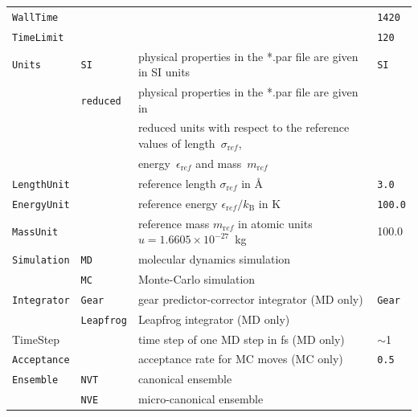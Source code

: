 \begin{landscape}
\begin{longtable}{llll}
		\texttt{WallTime}    & &  &     \texttt{1420}\\
		\texttt{TimeLimit}   & & &       \texttt{120}\\
		\midrule
		\texttt{Units}                      &  \texttt{SI}       & physical properties in the *.par file are given in SI units        & \texttt{SI}  \\
		\onehalfspacing            &  \texttt{reduced}  & physical properties in the *.par file are given in &\\
		&	& reduced units with respect to the reference values of length~$\sigma_{\mathrm ref}$,&\\ & & energy~$\epsilon_{\mathrm ref}$ and mass~$m_{\mathrm ref}$    &     \\
		\midrule
		\texttt{LengthUnit}                 &           & reference length $\sigma_{\mathrm ref}$ in \AA                      & \texttt{3.0} \\
		\texttt{EnergyUnit}                 &           & reference energy $\epsilon_{\mathrm ref} / k_{\mathrm B}$ in K      & \texttt{100.0} \\
		\onehalfspacing \texttt{MassUnit}   &           & reference mass $m_{\mathrm ref}$ in atomic units $u=1.6605 \times 10^{-27}$~kg & 100.0 \\
		\midrule
		\texttt{Simulation}                 & \texttt{MD}        & molecular dynamics simulation                             &    \\
		\onehalfspacing            & \texttt{MC}        & Monte-Carlo simulation                                    &    \\
		\midrule
		\texttt{Integrator}                 & \texttt{Gear}      & gear predictor-corrector integrator (MD only)             & \texttt{Gear} \\
		& \texttt{Leapfrog}  & Leapfrog integrator (MD only)                             &      \\
		\onehalfspacing TimeStep   &           & time step of one MD step in fs (MD only)                  & $\sim$1 \\
		\midrule
		\onehalfspacing \texttt{Acceptance} &           & acceptance rate for MC moves (MC only)                    & \texttt{0.5} \\
		\midrule
		\texttt{Ensemble}                   & \texttt{NVT}       & canonical ensemble                                        &     \\
		& \texttt{NVE}       & micro-canonical ensemble                                  &     \\

\end{longtable}
\end{landscape}
